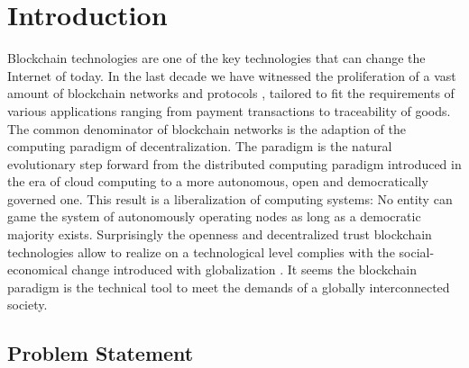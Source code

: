\newpage
\section{Introduction}
Blockchain technologies are one of the key technologies that can change the Internet of today. In the last decade we have witnessed the proliferation of a vast amount of blockchain networks and protocols \cite{}, tailored to fit the requirements of various applications ranging from payment transactions to traceability of goods.
%
The common denominator of blockchain networks is the adaption of the computing paradigm of decentralization. The paradigm is the natural evolutionary step forward from the distributed computing paradigm introduced in the era of cloud computing to a more autonomous, open and democratically governed one. This result is a liberalization of computing systems: No entity can game the system of autonomously operating nodes as long as a democratic majority exists. Surprisingly the openness and decentralized trust blockchain technologies allow to realize on a technological level complies with the social-economical change introduced with globalization \cite{}. It seems the blockchain paradigm is the technical tool to meet the demands of a globally interconnected society.





\subsection{Problem Statement}
